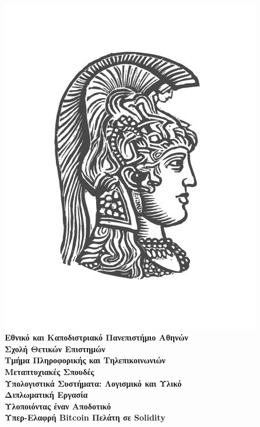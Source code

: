 \
\vspace{1.5cm}

\begin{center}
    {\includegraphics[scale=0.7]{figures/logo_uoa.jpg}}\\
    {\Large \textbf{Εθνικό και Καποδιστριακό Πανεπιστήμιο Αθηνών}} \\
    {\large \textbf{Σχολή Θετικών Επιστημών}} \\
    {\large \textbf{Τμήμα Πληροφορικής και Τηλεπικοινωνιών}}\\
    \vspace{1cm}
    {\large \textbf{Μεταπτυχιακές Σπουδές}} \\
    {\large \textbf{Υπολογιστικά Συστήματα: Λογισμικό και Υλικό}}\\
    \vspace{5mm}
    {\large \textbf{Διπλωματική Εργασία}}\\
    \vspace{0.8cm}
    {\textbf{\Large Υλοποιόντας έναν Αποδοτικό\\ Υπερ-Ελαφρή Bitcoin Πελάτη σε Solidity}}\\
    \vspace{1.5cm}



\end{center}
